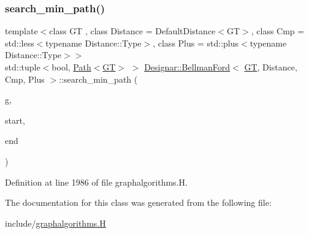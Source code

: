 \subsubsection{\texorpdfstring{search\+\_\+min\+\_\+path()}{search\_min\_path()}}
{\footnotesize\ttfamily template$<$class GT , class Distance  = Default\+Distance$<$\+G\+T$>$, class Cmp  = std\+::less$<$typename Distance\+::\+Type$>$, class Plus  = std\+::plus$<$typename Distance\+::\+Type$>$$>$ \\
std\+::tuple$<$bool, \hyperlink{class_designar_1_1_path}{Path}$<$\hyperlink{demo-buildgraph_8_c_a3001c40d2c31ca87ed96cd7d1334a55e}{GT}$>$ $>$ \hyperlink{class_designar_1_1_bellman_ford}{Designar\+::\+Bellman\+Ford}$<$ \hyperlink{demo-buildgraph_8_c_a3001c40d2c31ca87ed96cd7d1334a55e}{GT}, Distance, Cmp, Plus $>$\+::search\+\_\+min\+\_\+path (\begin{DoxyParamCaption}\item[{\hyperlink{demo-buildgraph_8_c_a3001c40d2c31ca87ed96cd7d1334a55e}{GT} \&}]{g,  }\item[{Node \&}]{start,  }\item[{Node \&}]{end }\end{DoxyParamCaption})\hspace{0.3cm}{\ttfamily [inline]}}



Definition at line 1986 of file graphalgorithms.\+H.



The documentation for this class was generated from the following file\+:\begin{DoxyCompactItemize}
\item 
include/\hyperlink{graphalgorithms_8_h}{graphalgorithms.\+H}\end{DoxyCompactItemize}

